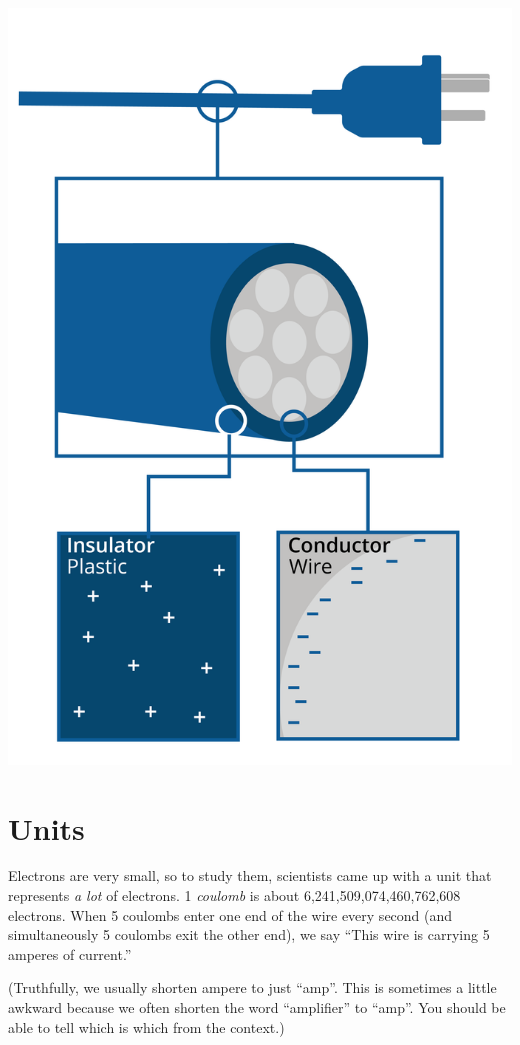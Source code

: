 \includegraphics[width=.8\textwidth]{plug.png}


\section{Units}

Electrons are very small, so to study them, scientists came up with a
unit that represents \textit{a lot} of electrons. 1 \textit{coulomb}
is about 6,241,509,074,460,762,608 electrons.  When 5 coulombs enter one end of the wire every second (and simultaneously 5 coulombs exit the other end), we say ``This wire is carrying 5 amperes of current.''

(Truthfully, we usually shorten ampere to just ``amp''.  This is
sometimes a little awkward because we often shorten the word
``amplifier'' to ``amp''. You should be able to tell which is which
from the context.)


